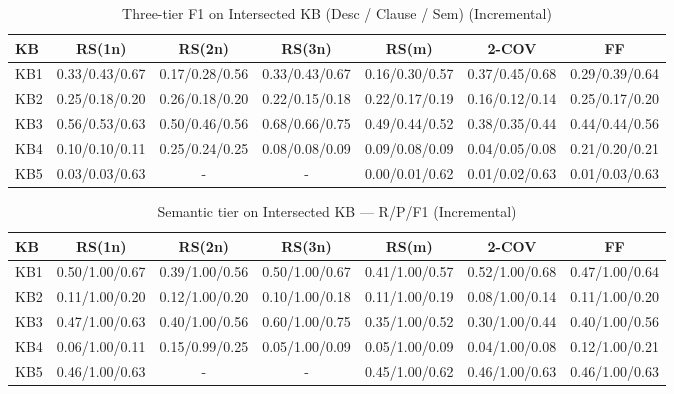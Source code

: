 \begin{table}[htbp]
\centering
\caption{Three-tier F1 on Intersected KB (Desc / Clause / Sem) (Incremental)}
\label{tab:three_tier_f1_incremental}
\begin{tabular}{lcccccc}
\toprule
KB & RS(1n) & RS(2n) & RS(3n) & RS(m) & 2-COV & FF \\
\midrule
KB1 & 0.33/0.43/0.67 & 0.17/0.28/0.56 & 0.33/0.43/0.67 & 0.16/0.30/0.57 & 0.37/0.45/0.68 & 0.29/0.39/0.64 \\
KB2 & 0.25/0.18/0.20 & 0.26/0.18/0.20 & 0.22/0.15/0.18 & 0.22/0.17/0.19 & 0.16/0.12/0.14 & 0.25/0.17/0.20 \\
KB3 & 0.56/0.53/0.63 & 0.50/0.46/0.56 & 0.68/0.66/0.75 & 0.49/0.44/0.52 & 0.38/0.35/0.44 & 0.44/0.44/0.56 \\
KB4 & 0.10/0.10/0.11 & 0.25/0.24/0.25 & 0.08/0.08/0.09 & 0.09/0.08/0.09 & 0.04/0.05/0.08 & 0.21/0.20/0.21 \\
KB5 & 0.03/0.03/0.63 & - & - & 0.00/0.01/0.62 & 0.01/0.02/0.63 & 0.01/0.03/0.63 \\
\bottomrule
\end{tabular}
\end{table}

\begin{table}[htbp]
\centering
\caption{Semantic tier on Intersected KB — R/P/F1 (Incremental)}
\label{tab:semantic_prf_incremental}
\begin{tabular}{lcccccc}
\toprule
KB & RS(1n) & RS(2n) & RS(3n) & RS(m) & 2-COV & FF \\
\midrule
KB1 & 0.50/1.00/0.67 & 0.39/1.00/0.56 & 0.50/1.00/0.67 & 0.41/1.00/0.57 & 0.52/1.00/0.68 & 0.47/1.00/0.64 \\
KB2 & 0.11/1.00/0.20 & 0.12/1.00/0.20 & 0.10/1.00/0.18 & 0.11/1.00/0.19 & 0.08/1.00/0.14 & 0.11/1.00/0.20 \\
KB3 & 0.47/1.00/0.63 & 0.40/1.00/0.56 & 0.60/1.00/0.75 & 0.35/1.00/0.52 & 0.30/1.00/0.44 & 0.40/1.00/0.56 \\
KB4 & 0.06/1.00/0.11 & 0.15/0.99/0.25 & 0.05/1.00/0.09 & 0.05/1.00/0.09 & 0.04/1.00/0.08 & 0.12/1.00/0.21 \\
KB5 & 0.46/1.00/0.63 & - & - & 0.45/1.00/0.62 & 0.46/1.00/0.63 & 0.46/1.00/0.63 \\
\bottomrule
\end{tabular}
\end{table}

